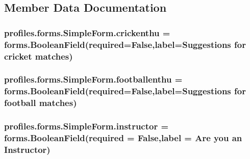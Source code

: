 \subsection{Member Data Documentation}
\subsubsection[{\texorpdfstring{crickenthu}{crickenthu}}]{\setlength{\rightskip}{0pt plus 5cm}profiles.\+forms.\+Simple\+Form.\+crickenthu = forms.\+Boolean\+Field(required=False,label=\textquotesingle{}Suggestions for cricket matches\textquotesingle{})\hspace{0.3cm}{\ttfamily [static]}}\hypertarget{classprofiles_1_1forms_1_1SimpleForm_a2c83193b1e44093b0f631842847a1931}{}\label{classprofiles_1_1forms_1_1SimpleForm_a2c83193b1e44093b0f631842847a1931}
\subsubsection[{\texorpdfstring{footballenthu}{footballenthu}}]{\setlength{\rightskip}{0pt plus 5cm}profiles.\+forms.\+Simple\+Form.\+footballenthu = forms.\+Boolean\+Field(required=False,label=\textquotesingle{}Suggestions for football matches\textquotesingle{})\hspace{0.3cm}{\ttfamily [static]}}\hypertarget{classprofiles_1_1forms_1_1SimpleForm_a1ba5ebb75a3a8343d641d558ae85627b}{}\label{classprofiles_1_1forms_1_1SimpleForm_a1ba5ebb75a3a8343d641d558ae85627b}
\subsubsection[{\texorpdfstring{instructor}{instructor}}]{\setlength{\rightskip}{0pt plus 5cm}profiles.\+forms.\+Simple\+Form.\+instructor = forms.\+Boolean\+Field(required = False,label = \textquotesingle{}Are you an Instructor\textquotesingle{})\hspace{0.3cm}{\ttfamily [static]}}\hypertarget{classprofiles_1_1forms_1_1SimpleForm_a230df5633ff8ea343d627abe65564577}{}\label{classprofiles_1_1forms_1_1SimpleForm_a230df5633ff8ea343d627abe65564577}
